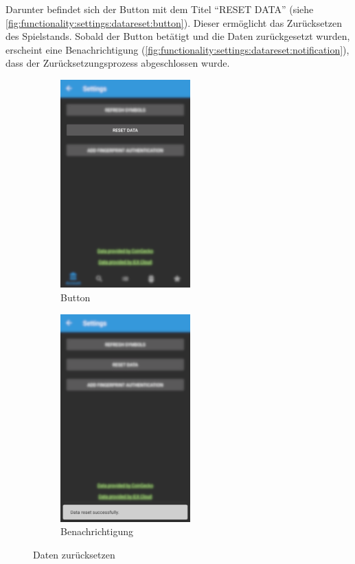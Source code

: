 \documentclass[a4paper]{article}
\begin{document}
Darunter befindet sich der Button mit dem Titel "`RESET DATA"' (siehe \autoref{fig:functionality:settings:datareset:button}). Dieser ermöglicht das Zurücksetzen des Spielstands. Sobald der Button betätigt und die Daten zurückgesetzt wurden, erscheint eine Benachrichtigung (\autoref{fig:functionality:settings:datareset:notification}), dass der Zurücksetzungsprozess abgeschlossen wurde.

\begin{figure}[H]
    \begin{subfigure}{.5\textwidth}
        \centering
        \includegraphics[height=8cm,keepaspectratio]{./images/settings/data_reset_button.png}
        \caption{Button}
        \label{fig:functionality:settings:datareset:button}
    \end{subfigure}
    \begin{subfigure}{.5\textwidth}
        \centering
        \includegraphics[height=8cm,keepaspectratio]{./images/settings/data_reset_done.png}
        \caption{Benachrichtigung}
        \label{fig:functionality:settings:datareset:notification}
    \end{subfigure}
    \caption{Daten zurücksetzen}
    \label{fig:functionality:settings:datareset}
\end{figure}
\end{document}
